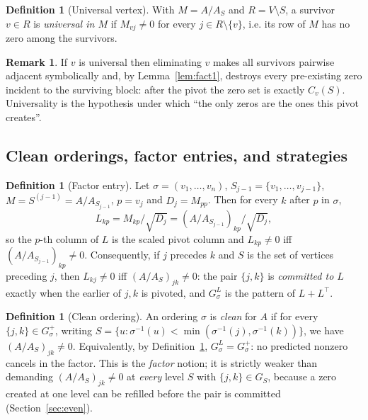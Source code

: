 \documentclass[11pt]{article}
\theoremstyle{plain}
\theoremstyle{definition}
\newtheorem{definition}[theorem]{Definition}
\newtheorem{remark}[theorem]{Remark}
\begin{document}
\begin{aiblock}
\begin{definition}[Universal vertex]\label{def:universal}
With $M=A/A_S$ and $R=V\setminus S$, a survivor $v\in R$ is \emph{universal in $M$} if $M_{vj}\neq0$
for every $j\in R\setminus\{v\}$, i.e. its row of $M$ has no zero among the survivors.
\end{definition}

\begin{remark}\label{rem:universal}
If $v$ is universal then eliminating $v$ makes all survivors pairwise adjacent symbolically and, by
Lemma~\ref{lem:fact1}, destroys every pre-existing zero incident to the surviving block: after the
pivot the zero set is exactly $C_v(S)$. Universality is the hypothesis under which ``the only zeros
are the ones this pivot creates''.
\end{remark}

\subsection{Clean orderings, factor entries, and strategies}

\begin{definition}[Factor entry]\label{def:Llink}
Let $\sigma=(v_1,\dots,v_n)$, $S_{j-1}=\{v_1,\dots,v_{j-1}\}$, $M=S^{(j-1)}=A/A_{S_{j-1}}$, $p=v_j$
and $D_j=M_{pp}$. Then for every $k$ after $p$ in $\sigma$,
\[
L_{kp}=M_{kp}/\sqrt{D_j}=(A/A_{S_{j-1}})_{kp}/\sqrt{D_j},
\]
so the $p$-th column of $L$ is the scaled pivot column and $L_{kp}\neq0$ iff
$(A/A_{S_{j-1}})_{kp}\neq0$. Consequently, if $j$ precedes $k$ and $S$ is the set of vertices
preceding $j$, then $L_{kj}\neq0$ iff $(A/A_S)_{jk}\neq0$: the pair $\{j,k\}$ is \emph{committed to
$L$} exactly when the earlier of $j,k$ is pivoted, and $G^L_\sigma$ is the pattern of $L+L^\top$.
\end{definition}

\begin{definition}[Clean ordering]\label{def:clean}
An ordering $\sigma$ is \emph{clean} for $A$ if for every $\{j,k\}\in G^+_\sigma$, writing
$S=\{u:\sigma^{-1}(u)<\min(\sigma^{-1}(j),\sigma^{-1}(k))\}$, we have $(A/A_S)_{jk}\neq0$.
Equivalently, by Definition~\ref{def:Llink}, $G^L_\sigma=G^+_\sigma$: no predicted nonzero cancels in
the factor. This is the \emph{factor} notion; it is strictly weaker than demanding
$(A/A_S)_{jk}\neq0$ at \emph{every} level $S$ with $\{j,k\}\in G_S$, because a zero created at one
level can be refilled before the pair is committed (Section~\ref{sec:even}).
\end{definition}


\end{aiblock}
\end{document}
